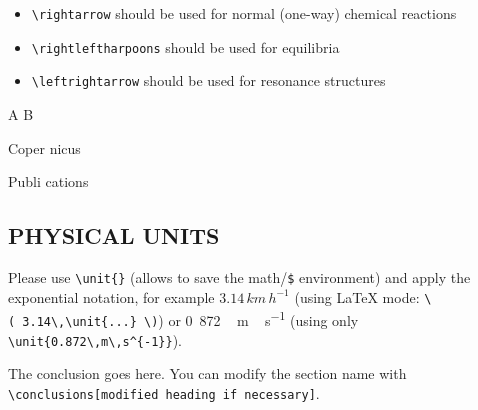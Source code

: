\documentclass[gc, manuscript, english]{copernicus}
\begin{document}
\begin{itemize}
\item
  \texttt{\textbackslash{}rightarrow} should be used for normal
  (one-way) chemical reactions
\item
  \texttt{\textbackslash{}rightleftharpoons} should be used for
  equilibria
\item
  \texttt{\textbackslash{}leftrightarrow} should be used for resonance
  structures
\end{itemize}

\begin{reaction}
A \rightarrow B \\
\end{reaction}
\begin{reaction}
Coper \rightleftharpoons nicus \\
\end{reaction}
\begin{reaction}
Publi \leftrightarrow cations
\end{reaction}

\subsection{PHYSICAL UNITS}

Please use \texttt{\textbackslash{}unit\{\}} (allows to save the
math/\texttt{\$} environment) and apply the exponential notation, for
example \(3.14\,\unit{km\,h^{-1}}\) (using LaTeX mode:
\texttt{\textbackslash{}(\ 3.14\textbackslash{},\textbackslash{}unit\{...\}\ \textbackslash{})})
or \unit{0.872\,m\,s^{-1}} (using only
\texttt{\textbackslash{}unit\{0.872\textbackslash{},m\textbackslash{},s\^{}\{-1\}\}}).

\conclusions[Conclusions]

The conclusion goes here. You can modify the section name with
\texttt{\textbackslash{}conclusions{[}modified\ heading\ if\ necessary{]}}.





\end{document}
